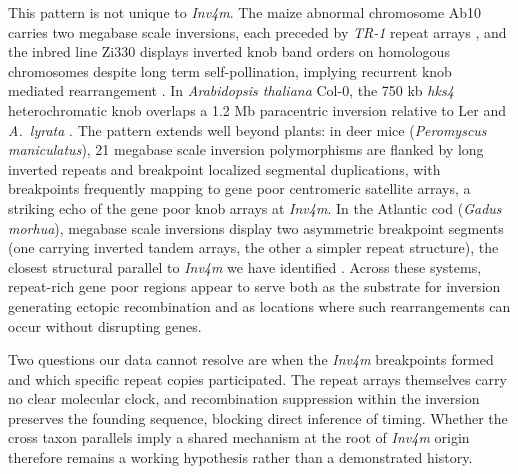 \documentclass[9pt,twocolumn,twoside]{rilabRxiv}
\newcommand{\invfour}{\textit{Inv4m}\xspace}
\begin{document}
This pattern is not unique to \invfour.
The maize abnormal chromosome Ab10 carries two megabase scale inversions, each preceded by \textit{TR-1} repeat arrays \citep{liu2020, mroczek2006}, and the inbred line Zi330 displays inverted knob band orders on homologous chromosomes despite long term self-pollination, implying recurrent knob mediated rearrangement \citep{yang2012}.
In \textit{Arabidopsis thaliana} Col-0, the 750 kb \textit{hks4} heterochromatic knob overlaps a 1.2 Mb paracentric inversion relative to Ler and \textit{A.~lyrata} \citep{schmidt2020, fransz2000, zapata2016}.
The pattern extends well beyond plants: in deer mice (\textit{Peromyscus maniculatus}), 21 megabase scale inversion polymorphisms are flanked by long inverted repeats and breakpoint localized segmental duplications, with breakpoints frequently mapping to gene poor centromeric satellite arrays, a striking echo of the gene poor knob arrays at \invfour \citep{Harringmeyer2022-kv, Gozashti2025-ya}.
In the Atlantic cod (\textit{Gadus morhua}), megabase scale inversions display two asymmetric breakpoint segments (one carrying inverted tandem arrays, the other a simpler repeat structure), the closest structural parallel to \invfour we have identified \citep{araya2025}.
Across these systems, repeat-rich gene poor regions appear to serve both as the substrate for inversion generating ectopic recombination and as locations where such rearrangements can occur without disrupting genes.
 
Two questions our data cannot resolve are when the \invfour breakpoints formed and which specific repeat copies participated.
The repeat arrays themselves carry no clear molecular clock, and recombination suppression within the inversion preserves the founding sequence, blocking direct inference of timing.
Whether the cross taxon parallels imply a shared mechanism at the root of \invfour origin therefore remains a working hypothesis rather than a demonstrated history.
\end{document}
